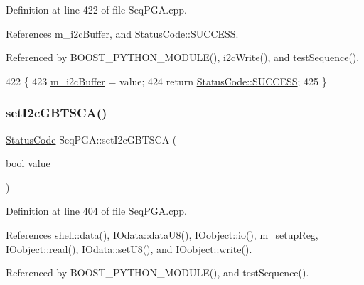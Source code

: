 Definition at line 422 of file Seq\+P\+G\+A.\+cpp.



References m\+\_\+i2c\+Buffer, and Status\+Code\+::\+S\+U\+C\+C\+E\+SS.



Referenced by B\+O\+O\+S\+T\+\_\+\+P\+Y\+T\+H\+O\+N\+\_\+\+M\+O\+D\+U\+L\+E(), i2c\+Write(), and test\+Sequence().


\begin{DoxyCode}
422                                                         \{
423   \hyperlink{classSeqPGA_afcef519379e9c6ba624ba58a4eac79f1}{m\_i2cBuffer} = value;
424   \textcolor{keywordflow}{return} \hyperlink{classStatusCode_a6f565cbeadc76d14c72f047e5e85eb4badd0da38d3ba0d922efd1f4619bc37ad8}{StatusCode::SUCCESS};
425 \}
\end{DoxyCode}
\mbox{\label{classSeqPGA_aef7911620b07d8aeef2a9ec95fa58ca4}} 
\subsubsection{\texorpdfstring{set\+I2c\+G\+B\+T\+S\+C\+A()}{setI2cGBTSCA()}}
{\footnotesize\ttfamily \hyperlink{classStatusCode}{Status\+Code} Seq\+P\+G\+A\+::set\+I2c\+G\+B\+T\+S\+CA (\begin{DoxyParamCaption}\item[{bool}]{value }\end{DoxyParamCaption})}



Definition at line 404 of file Seq\+P\+G\+A.\+cpp.



References shell\+::data(), I\+Odata\+::data\+U8(), I\+Oobject\+::io(), m\+\_\+setup\+Reg, I\+Oobject\+::read(), I\+Odata\+::set\+U8(), and I\+Oobject\+::write().



Referenced by B\+O\+O\+S\+T\+\_\+\+P\+Y\+T\+H\+O\+N\+\_\+\+M\+O\+D\+U\+L\+E(), and test\+Sequence().


